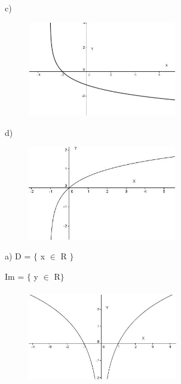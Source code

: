\begin{respostas}{7}
\begin{multicols}{2}
c)\begin{figure}[H]
	\begin{Center}
		\includegraphics[width=2.56in,height=1.62in]{capitulos/logaritmos_e_funcao_logaritmica/media/image32.JPG}
	\end{Center}
\end{figure}

d)\begin{figure}[H]
	\begin{Center}
		\includegraphics[width=2.55in,height=1.61in]{capitulos/logaritmos_e_funcao_logaritmica/media/image33.JPG}
	\end{Center}
\end{figure}

\ansitem{} 

a)
D = $ \{ $  x $ \in $ R $ \} $ 

Im = $ \{ $  y $ \in $ R$ \} $ 

\begin{figure}[H]
	\begin{Center}
		\includegraphics[width=2.57in,height=1.6in]{capitulos/logaritmos_e_funcao_logaritmica/media/image34.JPG}
	\end{Center}
\end{figure}


\end{multicols}
\end{respostas}
